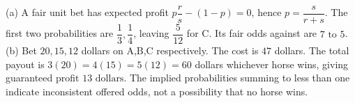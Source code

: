 (a) A fair unit bet has expected profit $p\dfrac{r}{s}-(1-p)=0$, hence $p=\dfrac{s}{r+s}$. The first two probabilities are $\dfrac{1}{3},\dfrac{1}{4}$, leaving $\dfrac{5}{12}$ for C. Its fair odds against are $\boxed{7\text{ to }5}$. (b) Bet $20,15,12$ dollars on A,B,C respectively. The cost is $47$ dollars. The total payout is $3(20)=4(15)=5(12)=60$ dollars whichever horse wins, giving guaranteed profit $\boxed{13\text{ dollars}}$. The implied probabilities summing to less than one indicate inconsistent offered odds, not a possibility that no horse wins.
